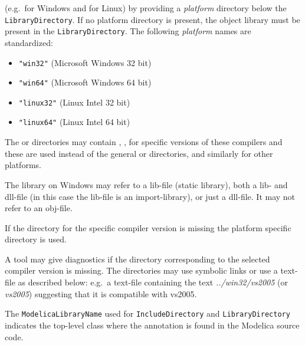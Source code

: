 \begin{itemize}
  (e.g.\ for Windows and for Linux) by providing a
  \emph{platform} directory below the \lstinline!LibraryDirectory!. If no
  platform directory is present, the object library must be present
  in the \lstinline!LibraryDirectory!. The following \emph{platform} names are
  standardized:
  \begin{itemize}
  \item
    \lstinline!"win32"! (Microsoft Windows 32 bit)
  \item
    \lstinline!"win64"! (Microsoft Windows 64 bit)
  \item
    \lstinline!"linux32"! (Linux Intel 32 bit)
  \item
    \lstinline!"linux64"! (Linux Intel 64 bit)
  \end{itemize}
\end{itemize}

The  or  directories may contain , , 
for specific versions of these compilers and these are used instead of
the general  or  directories, and similarly for other
platforms.

The library on Windows may refer to a lib-file (static library), both a lib- and dll-file (in this case the lib-file is an import-library),
or just a dll-file. It may not refer to an obj-file.

If the directory for the specific compiler version is missing the
platform specific directory is used.

\begin{nonnormative}
A tool may give diagnostics if the directory corresponding to the selected compiler version is missing.  The directories may use symbolic links or use
a text-file as described below: e.g.\ a text-file  containing the text \emph{../win32/vs2005} (or \emph{vs2005}) suggesting that it is
compatible with vs2005.
\end{nonnormative}

The \lstinline!ModelicaLibraryName! used for \lstinline!IncludeDirectory! and \lstinline!LibraryDirectory!
indicates the top-level class where the annotation is found in the
Modelica source code.

